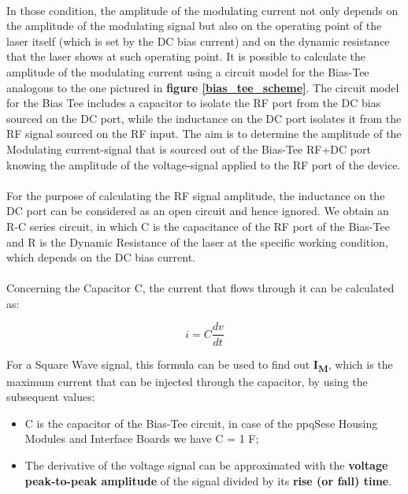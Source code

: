 \paragraph{} In those condition, the amplitude of the modulating current not only depends on the amplitude of the modulating signal but also on the operating point of the laser itself (which is set by the DC bias current) and on the dynamic resistance that the laser shows at such operating point. It is possible to calculate the amplitude of the modulating current using a circuit model for the Bias-Tee analogous to the one pictured in \textbf{figure \ref{bias_tee_scheme}}.
\newline The circuit model for the Bias Tee includes a capacitor to isolate the RF port from the DC bias sourced on the DC port, while the inductance on the DC port isolates it from the RF signal sourced on the RF input. The aim is to determine the amplitude of the Modulating current-signal that is sourced out of the Bias-Tee RF+DC port knowing the amplitude of the voltage-signal applied to the RF port of the device.

\paragraph{} For the purpose of calculating the RF signal amplitude, the inductance on the DC port can be considered as an open circuit and hence ignored. We obtain an R-C series circuit, in which C is the capacitance of the RF port of the Bias-Tee and R is the Dynamic Resistance of the laser at the specific working condition, which depends on the DC bias current.

\paragraph{} Concerning the Capacitor C, the current that flows through it can be calculated as:

\[ i = C \frac{dv}{dt}\]

For a Square Wave signal, this formula can be used to find out \textbf{I\textsubscript{M}}, which is the maximum current that can be injected through the capacitor, by using the subsequent values:
\begin{itemize}
    \item C is the capacitor of the Bias-Tee circuit, in case of the ppqSese Housing Modules and Interface Boards we have C = 1 \mu F;
    \item The derivative of the voltage signal can be approximated with the \textbf{voltage peak-to-peak amplitude} of the signal divided by its \textbf{rise (or fall) time}.
\end{itemize}

